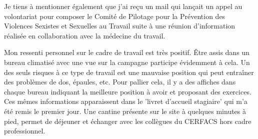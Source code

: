     Je tiens à mentionner également que j'ai reçu un mail qui lançait un appel au volontariat pour composer le Comité de Pilotage pour la Prévention des Violences Sexistes et Sexuelles au Travail suite à une réunion d'information réalisée en collaboration avec la médecine du travail.

\newpage


Mon ressenti personnel sur le cadre de travail est très positif. Être assis dans un bureau climatisé avec une vue sur la campagne participe évidemment à cela. Un des seuls risques à ce type de travail est une mauvaise position qui peut entraîner des problèmes de dos, épaules, etc. Pour pallier cela, il y a des affiches dans chaque bureau indiquant la meilleure position à avoir et proposant des exercices. Ces mêmes informations apparaissent dans le 'livret d'accueil stagiaire' qui m'a été remis le premier jour.
Une cantine présente sur le site à quelques minutes à pied, permet de déjeuner et échanger avec les collègues du CERFACS hors cadre professionnel.